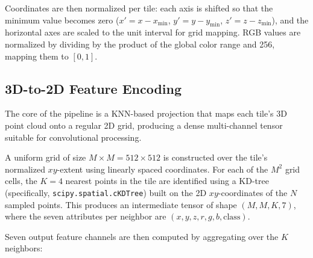 \documentclass[11pt]{article}
\begin{document}
Coordinates are then normalized per tile: each axis is shifted so that the minimum value becomes zero ($x' = x - x_{\min}$, $y' = y - y_{\min}$, $z' = z - z_{\min}$), and the horizontal axes are scaled to the unit interval for grid mapping.
RGB values are normalized by dividing by the product of the global color range and 256, mapping them to $[0, 1]$.

\subsection{3D-to-2D Feature Encoding}
\label{sec:method_encoding}

The core of the pipeline is a KNN-based projection that maps each tile's 3D point cloud onto a regular 2D grid, producing a dense multi-channel tensor suitable for convolutional processing.

A uniform grid of size $M \times M = 512 \times 512$ is constructed over the tile's normalized $xy$-extent using linearly spaced coordinates.
For each of the $M^2$ grid cells, the $K = 4$ nearest points in the tile are identified using a KD-tree (specifically, \texttt{scipy.spatial.cKDTree}) built on the 2D $xy$-coordinates of the $N$ sampled points.
This produces an intermediate tensor of shape $(M, M, K, 7)$, where the seven attributes per neighbor are $(x, y, z, r, g, b, \text{class})$.

Seven output feature channels are then computed by aggregating over the $K$ neighbors:
\end{document}
